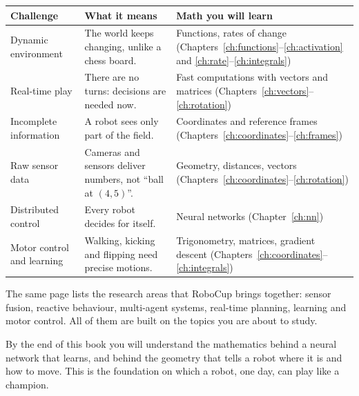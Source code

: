 \begin{center}
\renewcommand{\arraystretch}{1.35}
\begin{tabular}{>{\raggedright\arraybackslash}p{4.3cm}>{\raggedright\arraybackslash}p{4.3cm}>{\raggedright\arraybackslash}p{4.2cm}}
\textbf{Challenge} & \textbf{What it means} & \textbf{Math you will learn}\\ \hline
Dynamic environment & The world keeps changing, unlike a chess board. & Functions, rates of change (Chapters~\ref{ch:functions}--\ref{ch:activation} and \ref{ch:rate}--\ref{ch:integrals})\\
Real-time play & There are no turns: decisions are needed now. & Fast computations with vectors and matrices (Chapters~\ref{ch:vectors}--\ref{ch:rotation})\\
Incomplete information & A robot sees only part of the field. & Coordinates and reference frames (Chapters~\ref{ch:coordinates}--\ref{ch:frames})\\
Raw sensor data & Cameras and sensors deliver numbers, not ``ball at $(4,5)$''. & Geometry, distances, vectors (Chapters~\ref{ch:coordinates}--\ref{ch:rotation})\\
Distributed control & Every robot decides for itself. & Neural networks (Chapter~\ref{ch:nn})\\
Motor control and learning & Walking, kicking and flipping need precise motions. & Trigonometry, matrices, gradient descent (Chapters~\ref{ch:coordinates}--\ref{ch:integrals})\\
\end{tabular}
\end{center}

The same page lists the research areas that RoboCup brings together: sensor fusion, reactive behaviour, multi-agent systems, real-time planning, learning and motor control. All of them are built on the topics you are about to study.

\begin{keyidea}
By the end of this book you will understand the mathematics behind a neural network that learns, and behind the geometry that tells a robot where it is and how to move. This is the foundation on which a robot, one day, can play like a champion.
\end{keyidea}
